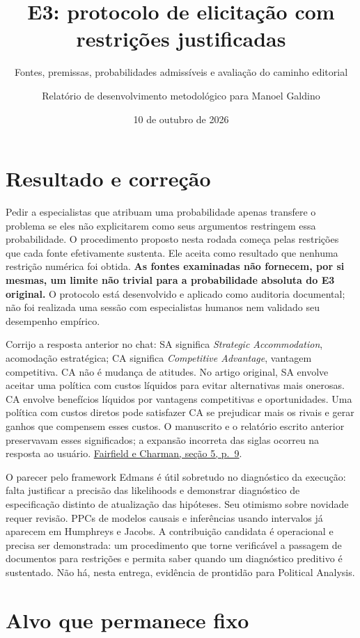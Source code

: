\documentclass[
  brazilian,
  11pt,
  a4paper,
]{article}
\title{E3: protocolo de elicitação com restrições justificadas}
\subtitle{Fontes, premissas, probabilidades admissíveis e avaliação do
caminho editorial}
\author{Relatório de desenvolvimento metodológico para Manoel Galdino}
\date{10 de outubro de 2026}
\begin{document}
\maketitle

\section{Resultado e correção}\label{resultado-e-correuxe7uxe3o}

Pedir a especialistas que atribuam uma probabilidade apenas transfere o
problema se eles não explicitarem como seus argumentos restringem essa
probabilidade. O procedimento proposto nesta rodada começa pelas
restrições que cada fonte efetivamente sustenta. Ele aceita como
resultado que nenhuma restrição numérica foi obtida. \textbf{As fontes
examinadas não fornecem, por si mesmas, um limite não trivial para a
probabilidade absoluta do E3 original.} O protocolo está desenvolvido e
aplicado como auditoria documental; não foi realizada uma sessão com
especialistas humanos nem validado seu desempenho empírico.

Corrijo a resposta anterior no chat: SA significa \emph{Strategic
Accommodation}, acomodação estratégica; CA significa \emph{Competitive
Advantage}, vantagem competitiva. CA não é mudança de atitudes. No
artigo original, SA envolve aceitar uma política com custos líquidos
para evitar alternativas mais onerosas. CA envolve benefícios líquidos
por vantagens competitivas e oportunidades. Uma política com custos
diretos pode satisfazer CA se prejudicar mais os rivais e gerar ganhos
que compensem esses custos. O manuscrito e o relatório escrito anterior
preservavam esses significados; a expansão incorreta das siglas ocorreu
na resposta ao usuário.
\href{https://doi.org/10.1017/psrm.2025.16}{Fairfield e Charman, seção
5, p.~9}.

O parecer pelo framework Edmans é útil sobretudo no diagnóstico da
execução: falta justificar a precisão das likelihoods e demonstrar
diagnóstico de especificação distinto de atualização das hipóteses. Seu
otimismo sobre novidade requer revisão. PPCs de modelos causais e
inferências usando intervalos já aparecem em Humphreys e Jacobs. A
contribuição candidata é operacional e precisa ser demonstrada: um
procedimento que torne verificável a passagem de documentos para
restrições e permita saber quando um diagnóstico preditivo é sustentado.
Não há, nesta entrega, evidência de prontidão para Political Analysis.

\section{Alvo que permanece fixo}\label{alvo-que-permanece-fixo}
\end{document}
